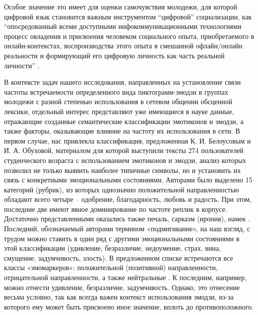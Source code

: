 Особое значение это имеет для оценки самочувствия молодежи, для которой цифровой язык становится важным инструментом “цифровой” социализации, как “опосредованный всеми доступными инфокоммуникационными технологиями процесс овладения и присвоения человеком социального опыта, приобретаемого в онлайн-контекстах, воспроизводства этого опыта в смешанной офлайн/онлайн реальности и формирующий его цифровую личность как часть реальной личности” \cite{Soldatova}.

В контексте задач нашего исследования, направленных на установление связи частоты встречаемости определенного вида пиктограмм-эмодзи в группах молодежи с разной степенью использования в сетевом общении обсценной лексики, отдельный интерес представляют уже имеющиеся в науке данные, отражающие созданные семантические классификации эмотиконов и эмодзи, а также факторы, оказывающие влияние на частоту их использования в сети. В первом случае, нас привлекла классификация, предложенная К. И. Белоусовым и И. А. Обуховой, материалом для которой выступили тексты 274 пользователей студенческого возраста с использованием эмотиконов и эмодзи, анализ которых позволил не только выявить наиболее типичные символы, но и установить их связь с конкретными эмоциональными состояниями. Авторами было выделено 15 категорий (рубрик), из которых однозначно положительной направленностью обладают всего четыре – одобрение, благодарность, любовь и радость. При этом, последние две имеют явное доминирование по частоте реплик в корпусе. Достаточно представленными оказались также печаль, сарказм (ирония), намек \cite{BelousovObukhova}. Последний, обозначаемый авторами термином «подмигивание», на наш взгляд, с трудом можно ставить в один ряд с другими эмоциональными состояниями в этой классификации (удивление, безразличие, недоумение, страх, вина, смущение, задумчивость, злость). В предложенном списке встречаются все классы «эмомаркеров»: положительной (позитивной) направленности, отрицательной направленности, а также нейтральные \cite{Mozgovaya}. К последним, например, можно отнести удивление, безразличие, задумчивость. Однако, это отнесение весьма условно, так как всегда важен контекст использования эмодзи, из-за которого ему может быть присвоено иное значение, вплоть до противоположного.


